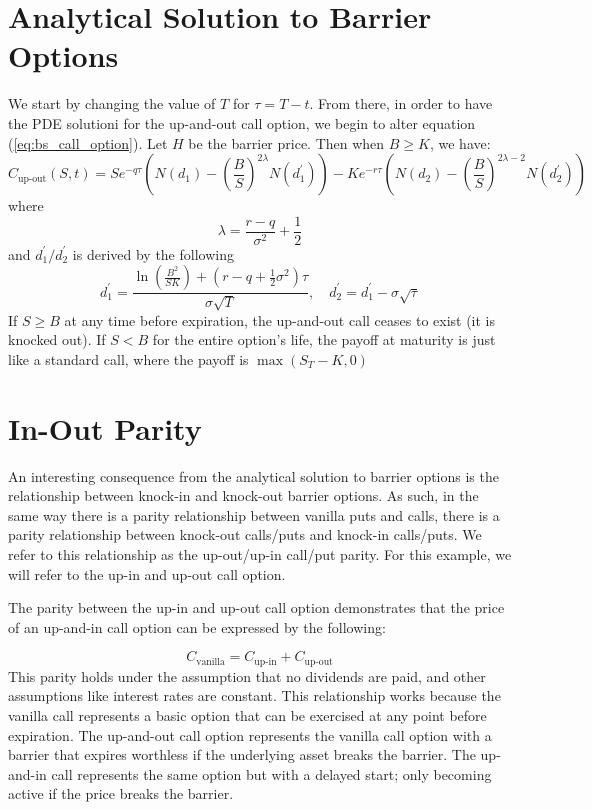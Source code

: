 \section{Analytical Solution to Barrier Options}

We start by changing the value of $T$ for $\tau=T-t$. From there, in order to have the PDE solutioni for the up-and-out call option, we begin to alter equation (\ref{eq:bs_call_option}). Let $H$ be the barrier price. Then when $B\geq K$, we have:
\begin{equation}\label{eq:DOC}
	C_{\text{up-out}}(S,t)=Se^{-q\tau}\left(N(d_1)-\left(\frac{B}{S}\right)^{2\lambda}N(d^\prime_1)\right)-Ke^{-r\tau}\left(N(d_2)-\left(\frac{B}{S}\right)^{2\lambda-2} N(d^\prime_2)\right)
\end{equation}
where
\begin{equation}
	\lambda=\frac{r-q}{\sigma^2}+\frac{1}{2}
\end{equation}
and $d^\prime_1/d^\prime_2$ is derived by the following
\begin{equation}
	d^\prime_1=\frac{\ln\left(\frac{B^2}{SK}\right)+(r-q+\tfrac{1}{2}\sigma^2)\tau}{\sigma\sqrt{T}},\quad d^\prime_2=d^\prime_1-\sigma\sqrt{\tau}
\end{equation}
If $S\geq B$ at any time before expiration, the up-and-out call ceases to exist (it is knocked out). If $S<B$ for the entire option's life, the payoff at maturity is just like a standard call, where the payoff is $\max\left(S_T-K, 0\right)$
\section{In-Out Parity}

An interesting consequence from the analytical solution to barrier options is the relationship between knock-in and knock-out barrier options. As such, in the same way there is a parity relationship between vanilla puts and calls, there is a parity relationship between knock-out calls/puts and knock-in calls/puts. We refer to this relationship as the up-out/up-in call/put parity. For this example, we will refer to the up-in and up-out call option.

The parity between the up-in and up-out call option demonstrates that the price of an up-and-in call option can be expressed by the following:

\begin{equation}
	C_{\text{vanilla}}=C_{\text{up-in}}+C_{\text{up-out}}
\end{equation}
This parity holds under the assumption that no dividends are paid, and other assumptions like interest rates are constant. This relationship works because the vanilla call represents a basic option that can be exercised at any point before expiration. The up-and-out call option represents the vanilla call option with a barrier that expires worthless if the underlying asset breaks the barrier. The up-and-in call represents the same option but with a delayed start; only becoming active if the price breaks the barrier.

